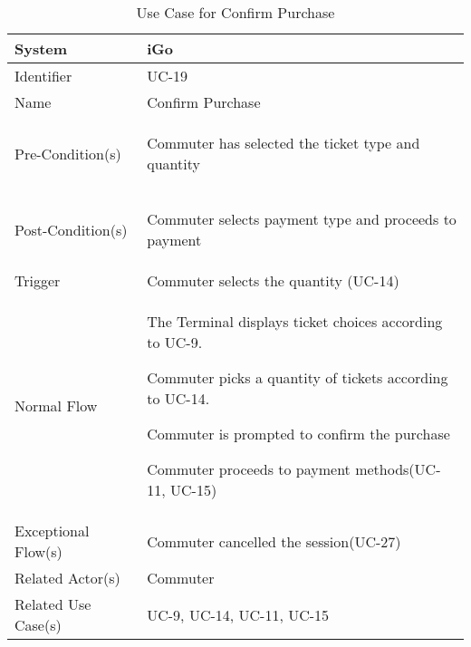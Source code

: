 \begin{table}[ht]
    \centering
    \begin{tabular}{|l|p{11cm}|}
        \hline
        System             & iGo\\
        \hline
        Identifier         & UC-19 \\
        \hline
        Name               & Confirm Purchase \\
        \hline
        Pre-Condition(s)   & 
        \begin{enumerate*}[itemjoin=\newline]
            \item Commuter has selected the ticket type and quantity 
        \end{enumerate*} \\
        \hline
        Post-Condition(s)  & 
        \begin{enumerate*}[itemjoin=\newline]
            \item Commuter selects payment type and proceeds to payment
        \end{enumerate*} \\
        \hline
        Trigger            & Commuter selects the quantity (UC-14)\\
        \hline
        Normal Flow        & 
        \begin{enumerate*}[itemjoin=\newline]
            \item The Terminal displays ticket choices according to UC-9.
            \item Commuter picks a quantity of tickets according to UC-14.
            \item Commuter is prompted to confirm the purchase 
            \item Commuter proceeds to payment methods(UC-11, UC-15)
        \end{enumerate*} \\
        \hline
        Exceptional Flow(s) & Commuter cancelled the session(UC-27) \\
        \hline
         Related Actor(s)   &  Commuter \\
        \hline
        Related Use Case(s)&  UC-9, UC-14, UC-11, UC-15\\
        \hline
    \end{tabular}
    \caption{Use Case for Confirm Purchase}
    \label{tab:UC_ConfirmPurchase}
\end{table}

